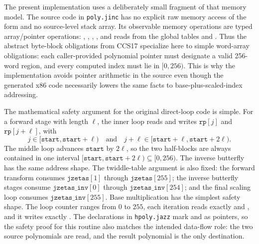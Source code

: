 The present implementation uses a deliberately small fragment of that memory
model.  The source code in \texttt{poly.jinc} has no explicit raw memory
access of the form \jasm{[p + e]} and no source-level stack array.  Its
observable memory operations are typed array/pointer operations:
, , , , and reads from
the global tables  and .  Thus the abstract
byte-block obligations from CCS17 specialize here to simple word-array
obligations: each caller-provided polynomial pointer must designate a valid
256-word  region, and every computed index must lie in
\([0,256)\).  This is why the implementation avoids pointer arithmetic in the
source even though the generated x86 code necessarily lowers the same facts to
base-plus-scaled-index addressing.

The mathematical safety argument for the original direct-loop code is simple.
For a forward stage with length \(\ell\), the inner loop reads and writes
\(\texttt{rp}[j]\) and \(\texttt{rp}[j+\ell]\), with
\[
  j \in [\texttt{start}, \texttt{start}+\ell)
  \quad\text{and}\quad
  j+\ell \in [\texttt{start}+\ell,\texttt{start}+2\ell).
\]
The middle loop advances \(\texttt{start}\) by \(2\ell\), so the two half-blocks
are always contained in one interval
\([\texttt{start},\texttt{start}+2\ell)\subseteq[0,256)\).  The inverse
butterfly has the same address shape.  The twiddle-table argument is also
fixed: the forward transform consumes \(\texttt{jzetas}[1]\) through
\(\texttt{jzetas}[255]\); the inverse butterfly stages consume
\(\texttt{jzetas\_inv}[0]\) through \(\texttt{jzetas\_inv}[254]\); and the
final scaling loop consumes \(\texttt{jzetas\_inv}[255]\).
Base multiplication has the simplest safety shape.  The loop counter
 ranges from \(0\) to \(255\), each iteration reads exactly
 and , and it writes exactly .  The
declarations in \texttt{hpoly.jazz} mark  and  as
 pointers, so the safety proof for this routine also matches the
intended data-flow role: the two source polynomials are read, and the result
polynomial is the only destination.

